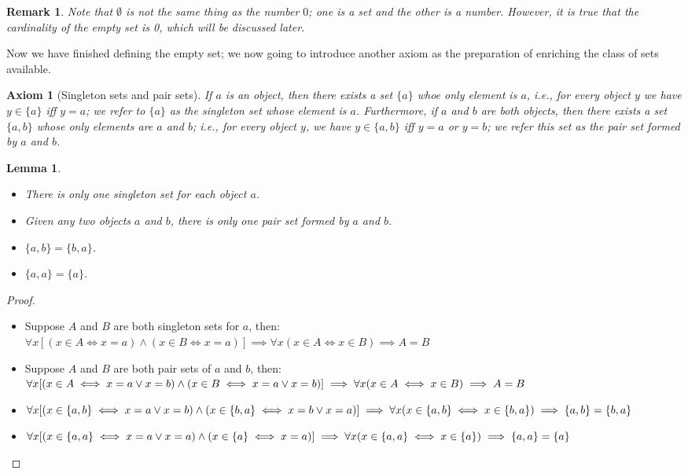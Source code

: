 \documentclass[a4paper]{book}
\newtheorem*{proof}{\textit{Proof.}}
\theoremstyle{break}
\newtheorem{axiom}{Axiom}[chapter]
\newtheorem{lemma}{Lemma}[section]
\newtheorem{remark}{Remark}[section]
\begin{document}
			\begin{remark}
				Note that $\emptyset$ is not the same thing as the number $0$; one is a set and the other is a number. However, it is true that the cardinality of the empty set is 0, which will be discussed later.
			\end{remark}
			Now we have finished defining the empty set; we now going to introduce another axiom as the preparation of enriching the class of sets available.
			\begin{axiom}[Singleton sets and pair sets]
				If $a$ is an object, then there exists a set $\{a\}$ whoe only element is $a$, \textit{i.e.,} for every object $y$ we have $y\in\{a\}$ iff $y=a$; we refer to $\{a\}$ as the singleton set whose element is $a$. Furthermore, if $a$ and $b$ are both objects, then there exists a set $\{a,b\}$ whose only elements are $a$ and $b$; \textit{i.e.,} for every object $y$, we have $y\in\{a,b\}$ iff $y=a$ or $y=b$; we refer this set as the pair set formed by $a$ and $b$.
			\end{axiom}
			\begin{lemma}~
				\begin{itemize}
					\item There is only one singleton set for each object $a$.
					\item Given any two objects $a$ and $b$, there is only one pair set formed by $a$ and $b$.
					\item $\{a,b\}=\{b,a\}$.
					\item $\{a,a\}=\{a\}$.
				\end{itemize}
			\end{lemma}
			\begin{proof}~
				\begin{itemize}
					\item Suppose $A$ and $B$ are both singleton sets for $a$, then:\\
					$\forall x[(x\in A\iff x=a)\land(x\in B\iff x=a)]\implies\forall x(x\in A\iff x\in B)\implies A=B$
					\item Suppose $A$ and $B$ are both pair sets of $a$ and $b$, then:\\
					$\forall x[(x\in A\iff x=a\lor x=b)\land(x\in B\iff x=a\lor x=b)]\implies\forall x(x\in A\iff x\in B)\\\implies A=B$
					\item $\forall x[(x\in \{a,b\}\iff x=a\lor x=b)\land(x\in \{b,a\}\iff x=b\lor x=a)]\\\implies\forall x(x\in \{a,b\}\iff x\in \{b,a\})\implies\{a,b\}=\{b,a\}$
					\item $\forall x[(x\in \{a,a\}\iff x=a\lor x=a)\land(x\in \{a\}\iff x=a)]\\\implies\forall x(x\in\{a,a\}\iff x\in \{a\})\implies\{a,a\}=\{a\}$
				\end{itemize}
			\end{proof}
\end{document}
